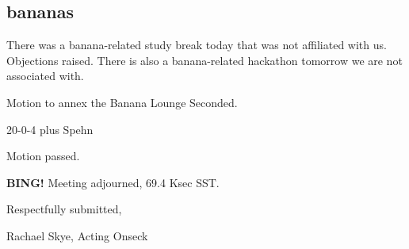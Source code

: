 \documentclass[10pt]{article}
\newcommand{\bing}{{\bf BING!} }
\newcommand{\ps}{ plus Spehn\xspace}
\newcommand{\onseck}{Rachael Skye, Acting Onseck}
\begin{document}
\subsection{bananas}
There was a banana-related study break today that was not affiliated with us. Objections raised. There is also a banana-related hackathon tomorrow we are not associated with.

Motion to annex the Banana Lounge
Seconded.

20-0-4 \ps

Motion passed.

\bing
\noindent
Meeting adjourned, 69.4 Ksec SST.

\vspace{18pt}

\centerline{Respectfully submitted,}
\centerline{\onseck}
\end{document}
